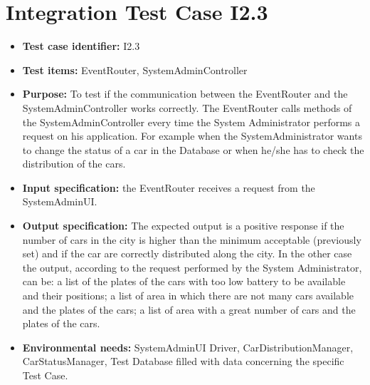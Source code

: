 \section{Integration Test Case I2.3}
\begin{itemize}
\item \textbf{Test case identifier:} I2.3
\item \textbf{Test items:} EventRouter, SystemAdminController
\item \textbf{Purpose:} To test if the communication between the EventRouter and the SystemAdminController works correctly. The EventRouter calls methods of the SystemAdminController every time the System Administrator performs a request on his application. For example when the SystemAdministrator wants to change the status of a car in the Database or when he/she has to check the distribution of the cars.
\item \textbf{Input specification:} the EventRouter receives a request from the SystemAdminUI.
\item \textbf{Output specification:} The expected output is a positive response if the number of cars in the city is higher than the minimum acceptable (previously set) and if the car are correctly distributed along the city. In the other case the output, according to the request performed by the System Administrator, can be: a list of the plates of the cars with too low battery to be available and their positions; a list of area in which there are not many cars available and the plates of the cars; a list of area with a great number of cars and the plates of the cars.
\item \textbf{Environmental needs:} SystemAdminUI Driver, CarDistributionManager, CarStatusManager, Test Database filled with data concerning the specific Test Case.
\end{itemize}

